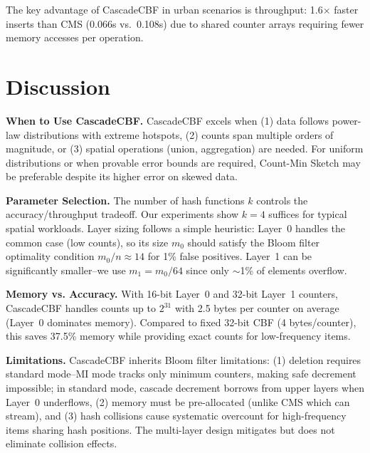 \documentclass[agile, final]{copernicus-agile}
\begin{document}
The key advantage of CascadeCBF in urban scenarios is throughput: 1.6$\times$ faster inserts than CMS (0.066s vs.\ 0.108s) due to shared counter arrays requiring fewer memory accesses per operation.


\section{Discussion}
\label{sec:discussion}

\textbf{When to Use CascadeCBF.} CascadeCBF excels when (1) data follows power-law distributions with extreme hotspots, (2) counts span multiple orders of magnitude, or (3) spatial operations (union, aggregation) are needed. For uniform distributions or when provable error bounds are required, Count-Min Sketch may be preferable despite its higher error on skewed data.

\textbf{Parameter Selection.} The number of hash functions $k$ controls the accuracy/throughput tradeoff. Our experiments show $k=4$ suffices for typical spatial workloads. Layer sizing follows a simple heuristic: Layer~0 handles the common case (low counts), so its size $m_0$ should satisfy the Bloom filter optimality condition $m_0/n \approx 14$ for 1\% false positives. Layer~1 can be significantly smaller--we use $m_1 = m_0/64$ since only $\sim$1\% of elements overflow.

\textbf{Memory vs. Accuracy.} With 16-bit Layer~0 and 32-bit Layer~1 counters, CascadeCBF handles counts up to $2^{31}$ with 2.5 bytes per counter on average (Layer~0 dominates memory). Compared to fixed 32-bit CBF (4 bytes/counter), this saves 37.5\% memory while providing exact counts for low-frequency items.

\textbf{Limitations.} CascadeCBF inherits Bloom filter limitations: (1) deletion requires standard mode--MI mode tracks only minimum counters, making safe decrement impossible; in standard mode, cascade decrement borrows from upper layers when Layer~0 underflows, (2) memory must be pre-allocated (unlike CMS which can stream), and (3) hash collisions cause systematic overcount for high-frequency items sharing hash positions. The multi-layer design mitigates but does not eliminate collision effects.


\end{document}
